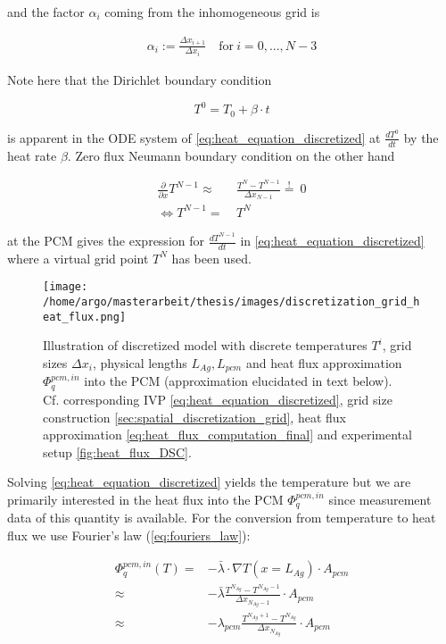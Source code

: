 \documentclass{scrartcl}[12pt, halfparskip]
\numberwithin{equation}{section}
\numberwithin{figure}{section}
\numberwithin{table}{section}
\begin{document}
and the factor $\alpha_i$ coming from the inhomogeneous grid is

\begin{align}
	\alpha_i := \frac{\Delta x_{i+1}}{\Delta x_{i}} \quad \text{for} \ i=0,...,N-3
\end{align}


Note here that the Dirichlet boundary condition 

\begin{equation}
	T^0 = T_0 + \beta \cdot t
\end{equation}

is apparent in the ODE system of \cref{eq:heat_equation_discretized} at $\frac{dT^0}{dt}$ by the heat rate $\beta$. Zero flux Neumann boundary condition on the other hand

\begin{align}
	\frac{\partial}{\partial x} T^{N-1} \approx & \ \frac{T^N - T^{N-1}}{\Delta x_{N-1}} \stackrel{!}{=} \ 0 \\
	\Leftrightarrow T^{N-1} = & \ T^N \nonumber 
\end{align}



 at the PCM gives the expression for $\frac{d T^{N-1}}{dt}$ in \cref{eq:heat_equation_discretized} where a virtual grid point $T^N$ has been used.

\begin{figure}[H]
	\centering
	\texttt{[image: /home/argo/masterarbeit/thesis/images/discretization\_grid\_heat\_flux.png]}
	\caption{Illustration of discretized model with discrete temperatures $T^i$, grid sizes $\Delta x_i$, physical lengths $L_{Ag}, L_{pcm}$ and heat flux approximation $\varPhi_q^{pcm,in}$ into the PCM (approximation elucidated in text below). \\
	Cf.	corresponding IVP \cref{eq:heat_equation_discretized}, grid size construction \cref{sec:spatial_discretization_grid}, heat flux approximation \cref{eq:heat_flux_computation_final} and experimental setup \cref{fig:heat_flux_DSC}.}
	\label{fig:mathematical_model_discretized}
\end{figure}


Solving \cref{eq:heat_equation_discretized} yields the temperature but we are primarily interested in the heat flux into the PCM $\varPhi_{q}^{pcm,in}$ since measurement data of this quantity is available. For the conversion from temperature to heat flux we use Fourier's law (\cref{eq:fouriers_law}):

\begin{align}
	\varPhi_{q}^{pcm,in}(T) = & - \bar{\lambda} \cdot \nabla T (x=L_{Ag}) \cdot A_{pcm} \\
	\approx & - \bar{\lambda} \frac{T^{N_{Ag}} - T^{N_{Ag}-1}}{\Delta x_{N_{Ag}-1}} \cdot A_{pcm} \nonumber \\
	\approx & - \lambda_{pcm} \frac{T^{N_{Ag}+1} - T^{N_{Ag}}}{\Delta x_{N_{Ag}}} \cdot A_{pcm} \nonumber
\end{align}
\end{document}
